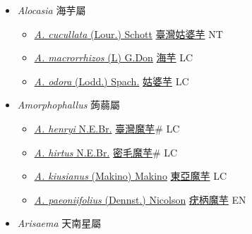 
  \begin{itemize}
 \item[] \textit{Alocasia} 海芋屬
                    
  \begin{itemize}
        \item[] \href{http://www.theplantlist.org/tpl1.1/search?q=Alocasia+cucullata}{\textit{A. cucullata} (Lour.) Schott}   \href{\detokenize{http://taibnet.sinica.edu.tw/chi/taibnet_species_list.php?T2=臺灣姑婆芋&T2_new_value=true&fr=y}}{臺灣姑婆芋} NT
        \item[] \href{http://www.theplantlist.org/tpl1.1/search?q=Alocasia+macrorrhizos}{\textit{A. macrorrhizos} (L) G.Don}   \href{\detokenize{http://taibnet.sinica.edu.tw/chi/taibnet_species_list.php?T2=海芋&T2_new_value=true&fr=y}}{海芋} LC
        \item[] \href{http://www.theplantlist.org/tpl1.1/search?q=Alocasia+odora}{\textit{A. odora} (Lodd.) Spach.}   \href{\detokenize{http://taibnet.sinica.edu.tw/chi/taibnet_species_list.php?T2=姑婆芋&T2_new_value=true&fr=y}}{姑婆芋} LC
  \end{itemize}
 \item[] \textit{Amorphophallus} 蒟蒻屬
                    
  \begin{itemize}
        \item[] \href{http://www.theplantlist.org/tpl1.1/search?q=Amorphophallus+henryi}{\textit{A. henryi} N.E.Br.}   \href{\detokenize{http://taibnet.sinica.edu.tw/chi/taibnet_species_list.php?T2=臺灣魔芋&T2_new_value=true&fr=y}}{臺灣魔芋}\# LC
        \item[] \href{http://www.theplantlist.org/tpl1.1/search?q=Amorphophallus+hirtus}{\textit{A. hirtus} N.E.Br.}   \href{\detokenize{http://taibnet.sinica.edu.tw/chi/taibnet_species_list.php?T2=密毛魔芋&T2_new_value=true&fr=y}}{密毛魔芋}\# LC
        \item[] \href{http://www.theplantlist.org/tpl1.1/search?q=Amorphophallus+kiusianus}{\textit{A. kiusianus} (Makino) Makino}   \href{\detokenize{http://taibnet.sinica.edu.tw/chi/taibnet_species_list.php?T2=東亞魔芋&T2_new_value=true&fr=y}}{東亞魔芋} LC
        \item[] \href{http://www.theplantlist.org/tpl1.1/search?q=Amorphophallus+paeoniifolius}{\textit{A. paeoniifolius} (Dennst.) Nicolson}   \href{\detokenize{http://taibnet.sinica.edu.tw/chi/taibnet_species_list.php?T2=疣柄魔芋&T2_new_value=true&fr=y}}{疣柄魔芋} EN
  \end{itemize}
 \item[] \textit{Arisaema} 天南星屬
                    

\end{itemize}
